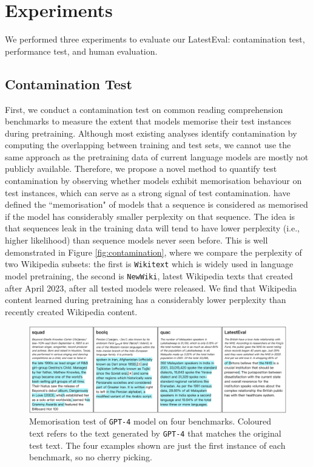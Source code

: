 \documentclass[letterpaper]{article} %
\begin{document}
\section{Experiments}

We performed three experiments to evaluate our LatestEval: contamination test, performance test, and human evaluation.

\subsection{Contamination Test}
First, we conduct a contamination test on common reading comprehension benchmarks to measure the extent that models memorise their test instances during pretraining. Although most existing analyses identify contamination by computing the overlapping between training and test sets,
we cannot use the same approach as the pretraining data of current language models are mostly not publicly available.
Therefore, we propose a novel method to quantify test contamination by observing whether models exhibit memorisation behaviour on test instances, which can serve as a strong signal of test contamination. \citet{carlini2021extracting,carlini2022quantifying} have defined the ``memorisation" of models that a sequence is considered as memorised if the model has considerably smaller perplexity on that sequence. The idea is that sequences leak in the training data will tend to have lower perplexity (i.e., higher likelihood) than sequence models never seen before. This is well demonstrated in Figure \ref{fig:contamination}, where we compare the perplexity of two Wikipedia subsets: the first is \texttt{Wikitext} \cite{merity2016pointer} which is widely used in language model pretraining, the second is \texttt{NewWiki}, latest Wikipedia texts that created after April 2023, after all tested models were released. We find that Wikipedia content learned during pretraining has a considerably lower perplexity than recently created Wikipedia content.

\begin{figure}[t]
    \centering
    \includegraphics[width=\textwidth]{visualisation.png}
    \caption{Memorisation test of \texttt{GPT-4} model on four benchmarks. Coloured text refers to the text generated by \texttt{GPT-4} that matches the original test text. The four examples shown are just the first instance of each benchmark, so no cherry picking.}
    \label{fig:visualisation}
\end{figure}
\end{document}
